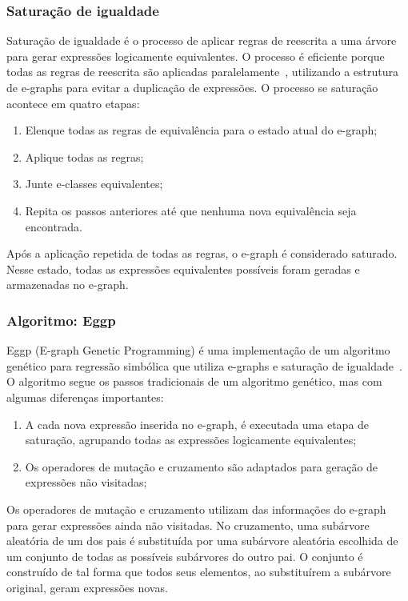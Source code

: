 \subsubsection{Saturação de igualdade}

Saturação de igualdade é o processo de aplicar regras de reescrita a uma árvore para gerar expressões logicamente equivalentes. O processo é eficiente porque todas as regras de reescrita são aplicadas paralelamente~\cite{eggp}, utilizando a estrutura de e-graphs para evitar a duplicação de expressões. O processo se saturação acontece em quatro etapas:
\begin{enumerate}
  \item Elenque todas as regras de equivalência para o estado atual do e-graph;
  \item Aplique todas as regras;
  \item Junte e-classes equivalentes;
  \item Repita os passos anteriores até que nenhuma nova equivalência seja encontrada.
\end{enumerate}

Após a aplicação repetida de todas as regras, o e-graph é considerado saturado. Nesse estado, todas as expressões equivalentes possíveis foram geradas e armazenadas no e-graph.

\subsubsection{Algoritmo: Eggp}

Eggp (E-graph Genetic Programming) é uma implementação de um algoritmo genético para regressão simbólica que utiliza e-graphs e saturação de igualdade~\cite{eggp}. O algoritmo segue os passos tradicionais de um algoritmo genético, mas com algumas diferenças importantes:
\begin{enumerate}
  \item A cada nova expressão inserida no e-graph, é executada uma etapa de saturação, agrupando todas as expressões logicamente equivalentes;
  \item Os operadores de mutação e cruzamento são adaptados para geração de expressões não visitadas;
\end{enumerate}

Os operadores de mutação e cruzamento utilizam das informações do e-graph para gerar expressões ainda não visitadas. No cruzamento, uma subárvore aleatória de um dos pais é substituída por uma subárvore aleatória escolhida de um conjunto de todas as possíveis subárvores do outro pai. O conjunto é construído de tal forma que todos seus elementos, ao substituírem a subárvore original, geram expressões novas.

